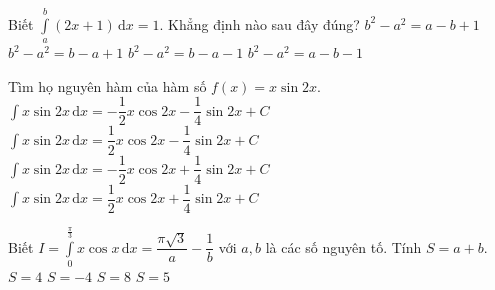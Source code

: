 \begin{ex}%
	Biết $\displaystyle\int\limits_a^b (2x+1) \mathrm{\,d}x=1$. Khẳng định nào sau đây đúng?
	\choice
	{\True $b^2-a^2=a-b+1$}
	{$b^2-a^2=b-a+1$}
	{$b^2-a^2=b-a-1$}
	{$b^2-a^2=a-b-1$}
\end{ex}
\begin{ex}%
	Tìm họ nguyên hàm của hàm số $f(x)= x\sin 2x$.
	\choice
	{$\displaystyle\int x\sin 2x \mathrm{\,d}x = -\dfrac{1}{2}x\cos 2x-\dfrac{1}{4}\sin 2x+C$}
	{$\displaystyle\int x\sin 2x \mathrm{\,d}x=\dfrac{1}{2}x\cos 2x-\dfrac{1}{4}\sin 2x+C$}
	{\True $\displaystyle\int x\sin 2x \mathrm{\,d}x=-\dfrac{1}{2}x\cos 2x+\dfrac{1}{4}\sin 2x+C$}
	{$\displaystyle\int x\sin 2x \mathrm{\,d}x=\dfrac{1}{2}x\cos 2x+\dfrac{1}{4}\sin 2x+C$}
\end{ex}
\begin{ex}%
	Biết $I= \displaystyle\int\limits_0^{\tfrac{\pi}{3}} x\cos x \mathrm{\,d}x=\dfrac{\pi \sqrt{3}}{a}-\dfrac{1}{b}$ với $a,b$ là các số nguyên tố. Tính $S=a+b$.
	\choice
	{$S=4$}
	{$S=-4$}
	{\True $S=8$}
	{$S=5$}
\end{ex}
